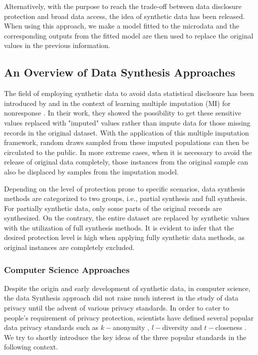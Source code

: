 Alternatively, with the purpose to reach the trade-off between data disclosure protection and broad
data access, the idea of synthetic data has been released. When using this approach, we make a model
fitted to the microdata and the corresponding outputs from the fitted model are then used to replace
the original values in the previous information.


\subsection{An Overview of Data Synthesis Approaches}
\label{subsec:datasynthesis}
The field of employing synthetic data to avoid data statistical disclosure has been introduced by \citet{rubin1993statistical}
and \citet{little1993statistical} in the context of learning multiple imputation (MI) for nonresponse \citep{little2019statistical}.
In their work, they showed the possibility to get these sensitive values replaced with "imputed" values
rather than impute data for those missing records in the original dataset. With the application of this multiple
imputation framework, random draws sampled from these imputed populations can then be circulated to the public. In more
extreme cases, when it is necessary to avoid the release of original data completely, those instances from
the original sample can also be displaced by samples from the imputation model.

Depending on the level of protection prone to specific scenarios, data synthesis methods are categorized to two groups, i.e.,
partial synthesis and full synthesis. For partially synthetic data, only some parts of the original records are synthesized. 
On the contrary, the entire dataset are replaced by synthetic values with the utilization of full synthesis methods.
It is evident to infer that the desired protection level is high when applying fully synthetic data methods, as original instances
are completely excluded. 



\subsubsection{Computer Science Approaches}
\label{subsubsec:csapproach}
Despite the origin and early development of synthetic data, in computer science, the data Synthesis
approach did not raise much interest in the study of data privacy until the advent of various privacy
standards. In order to cater to people's requirement of privacy protection, scientists have defined
several popular data privacy standards such as $k-$anonymity \citep{sweeney2002k}, $l-$diversity \citep{machanavajjhala2007diversity}
and $t-$closeness \citep{li2006t}. We try to shortly introduce the key ideas of the three popular
standards in the following context. 

